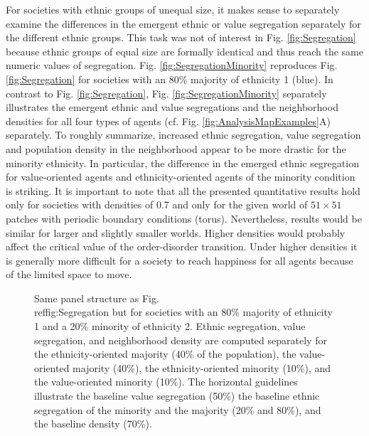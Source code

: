 \documentclass{ws-acs}
\begin{document}
{For societies with ethnic groups of unequal size, it makes sense to separately examine the differences in the emergent ethnic or value segregation separately for the different ethnic groups. This task was not of interest in Fig. \ref{fig:Segregation} because  ethnic groups of equal size are formally identical and thus reach the same numeric values of segregation. Fig. \ref{fig:SegregationMinority} reproduces Fig. \ref{fig:Segregation} for societies with an 80\% majority of ethnicity 1 (blue). In contrast to Fig. \ref{fig:Segregation}, Fig. \ref{fig:SegregationMinority} separately illustrates the emergent ethnic and value segregations and the neighborhood densities for all four types of agents (cf. Fig. \ref{fig:AnalysisMapExamples}A) separately. To roughly summarize, increased ethnic segregation, value segregation and population density in the neighborhood appear to be more drastic for the minority ethnicity. In particular, the difference in the emerged ethnic segregation for value-oriented agents and ethnicity-oriented agents of the minority condition is striking. It is important to note that all the presented quantitative results hold only for societies with densities of 0.7 and only for the given world of $51\times 51$ patches with periodic boundary conditions (torus). Nevertheless, results would be similar for larger and slightly smaller worlds. Higher densities would probably affect the critical value of the order-disorder transition. Under higher densities it is generally more difficult for a society to reach happiness for all agents because of the limited space to move.

\begin{figure}[th]
\centerline{}
\vspace*{8pt}
\caption{Same panel structure as Fig.\\ref{fig:Segregation} but for societies with an 80\% majority of ethnicity 1 and a 20\% minority of ethnicity 2. Ethnic segregation, value segregation, and neighborhood density are computed separately for the ethnicity-oriented majority (40\% of the population), the value-oriented majority (40\%), the ethnicity-oriented minority (10\%), and the value-oriented minority (10\%). The horizontal guidelines illustrate the baseline value segregation (50\%) the baseline ethnic segregation of the minority and the majority (20\% and 80\%), and the baseline density (70\%).}
\end{figure}



}
\end{document}
